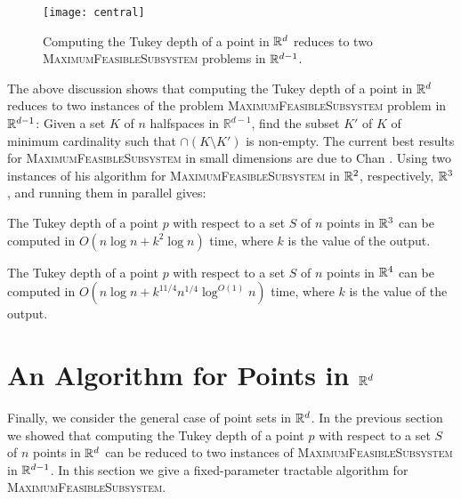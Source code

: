 \documentclass[charterfonts,lotsofwhite]{patmorin}
\begin{document}
\begin{figure}
\begin{center}\texttt{[image: central]}\end{center}
\caption{Computing the Tukey depth of a point in $\mathbb{R}^d$ reduces to two
\textsc{MaximumFeasibleSubsystem} problems in $\mathbb{R}^{d-1}$.}
\end{figure}

The above discussion shows that computing the Tukey depth of a point
in $\mathbb{R}^d$ reduces to two instances of the problem
\textsc{MaximumFeasibleSubsystem} problem in $\mathbb{R}^{d-1}$: Given a set
$K$ of $n$ halfspaces in $\mathbb{R}^{d-1}$, find the subset $K'$ of
$K$ of minimum cardinality such that $\cap (K\setminus K')$ is
non-empty.  The current best results for
\textsc{MaximumFeasibleSubsystem} in small dimensions are due to Chan
\cite{c05}.  Using two instances of his algorithm for
\textsc{MaximumFeasibleSubsystem} in $\mathbb{R}^2$, respectively, $\mathbb{R}^3$, and
running them in parallel gives:

\begin{thm}
The Tukey depth of a point $p$ with respect to a set $S$ of $n$ points
in $\mathbb{R}^3$ can be computed in $O(n\log n + k^2\log n)$ time, where
$k$ is the value of the output.
\end{thm}


\begin{thm}
The Tukey depth of a point $p$ with respect to a set $S$ of $n$ points
in $\mathbb{R}^4$ can be computed in $O(n\log n + k^{11/4}n^{1/4}\log^{O(1)}
n)$ time, where $k$ is the value of the output.
\end{thm}

\section{An Algorithm for Points in $\mathbb{R}^d$}

Finally, we consider the general case of point sets in $\mathbb{R}^d$.  In the
previous section we showed that computing the Tukey depth of a point
$p$ with respect to a set $S$ of $n$ points in $\mathbb{R}^d$ can be reduced
to two instances of \textsc{MaximumFeasibleSubsystem} in $\mathbb{R}^{d-1}$.
In this section we give a fixed-parameter tractable \cite{df98}
algorithm for \textsc{MaximumFeasibleSubsystem}.   
\end{document}
